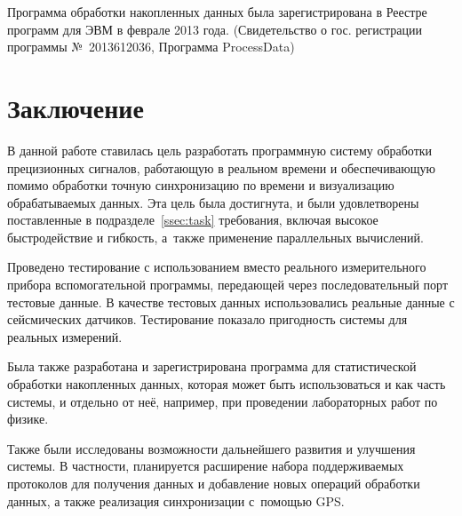 \documentclass[a4paper, 14pt]{extarticle}
\newcommand\sectiontoc[1]{\section*{#1}\addcontentsline{toc}{section}{#1}}
\begin{document}
  Программа обработки накопленных данных была зарегистрирована в Реестре программ для ЭВМ в феврале 2013
  года. (Свидетельство о гос. регистрации программы №~2013612036, Программа ProcessData)

  \sectiontoc{Заключение}

  В данной работе ставилась цель разработать программную систему обработки прецизионных сигналов,
  работающую в реальном времени и обеспечивающую помимо обработки точную синхронизацию по времени и
  визуализацию обрабатываемых данных. Эта цель была достигнута, и были удовлетворены поставленные в
  подразделе~\ref{ssec:task} требования, включая высокое быстродействие и гибкость, а~также применение
  параллельных вычислений.

  Проведено тестирование с использованием вместо реального измерительного прибора вспомогательной
  программы, передающей через последовательный порт тестовые данные. В качестве тестовых данных
  использовались реальные данные с сейсмических датчиков. Тестирование показало пригодность системы
  для реальных измерений.

  Была также разработана и зарегистрирована программа для статистической обработки накопленных
  данных, которая может быть использоваться и как часть системы, и отдельно от неё, например, при
  проведении лабораторных работ по физике.

  Также были исследованы возможности дальнейшего развития и улучшения системы. В частности,
  планируется расширение набора поддерживаемых протоколов для получения данных и добавление новых
  операций обработки данных, а также реализация синхронизации с~помощью GPS.


  \begin{flushleft}
    
  \end{flushleft}
\end{document}
